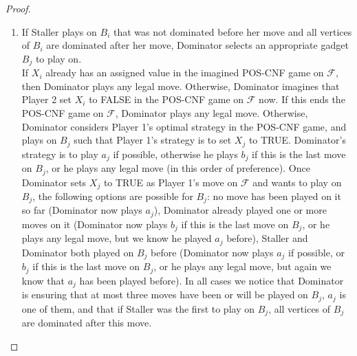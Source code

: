 \documentclass[10pt,a4paper]{amsart}
\newcommand{\F}{\mathcal{F}}
\begin{document}
\begin{proof}
\begin{enumerate}[(1)]
		\item If Staller plays on $B_i$ that was not dominated before her move and all vertices of $B_i$ are dominated after her move, Dominator selects an appropriate gadget $B_{j}$ to play on.\\
		If $X_i$ already has an assigned value in the imagined POS-CNF game on $\F$, then Dominator plays any legal move. Otherwise, Dominator imagines that Player 2 set $X_i$ to FALSE in the POS-CNF game on $\F$ now. If this ends the POS-CNF game on $\F$, Dominator plays any legal move. Otherwise, Dominator considers Player 1's optimal strategy in the POS-CNF game, and plays on $B_{j}$ such that Player 1's strategy is to set $X_{j}$ to TRUE. Dominator's strategy is to play $a_j$ if possible, otherwise he plays $b_j$ if this is the last move on $B_j$, or he plays any legal move (in this order of preference). Once Dominator sets $X_j$ to TRUE as Player 1's move on $\F$ and wants to play on $B_j$, the following options are possible for $B_j$: no move has been played on it so far (Dominator now plays $a_j$), Dominator already played one or more moves on it (Dominator now plays $b_j$ if this is the last move on $B_j$, or he plays any legal move, but we know he played $a_j$ before), Staller and Dominator both played on $B_j$ before (Dominator now plays $a_j$ if possible, or $b_j$ if this is the last move on $B_j$, or he plays any legal move, but again we know that $a_j$ has been played before). In all cases we notice that Dominator is ensuring that at most three moves have been or will be played on $B_j$, $a_j$ is one of them, and that if Staller was the first to play on $B_j$, all vertices of $B_j$ are dominated after this move.
		

\end{enumerate}
\end{proof}
\end{document}
